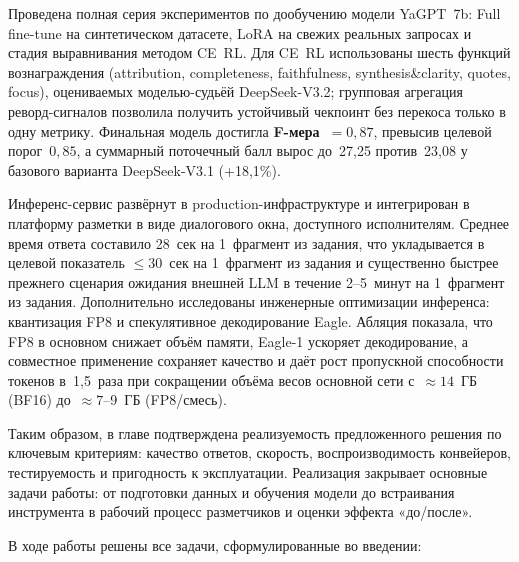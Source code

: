\documentclass[times]{itmo-student-thesis}
\begin{document}
Проведена полная серия экспериментов по дообучению модели YaGPT~7b:
Full fine-tune на синтетическом датасете, LoRA на свежих реальных запросах
и стадия выравнивания методом CE~RL. Для CE~RL использованы шесть функций вознаграждения
(attribution, completeness, faithfulness, synthesis\&clarity, quotes, focus),
оцениваемых моделью-судьёй DeepSeek-V3.2; групповая агрегация реворд-сигналов
позволила получить устойчивый чекпоинт без перекоса только в одну метрику.
Финальная модель достигла \textbf{F-мера~$= 0{,}87$}, превысив целевой
порог~$0{,}85$, а суммарный поточечный балл вырос до~27{,}25 против~23{,}08
у базового варианта DeepSeek-V3.1 (+18{,}1\%).

Инференс-сервис развёрнут в production-инфраструктуре и интегрирован
в платформу разметки в виде диалогового окна, доступного исполнителям.
Среднее время ответа составило 28~сек на 1~фрагмент из задания, что укладывается
в целевой показатель $\le 30$~сек на 1~фрагмент из задания и существенно быстрее
прежнего сценария ожидания внешней LLM в течение 2--5~минут на 1~фрагмент
из задания. Дополнительно исследованы инженерные оптимизации
инференса: квантизация FP8 и спекулятивное декодирование Eagle. Абляция
показала, что FP8 в основном снижает объём памяти, Eagle-1 ускоряет
декодирование, а совместное применение сохраняет качество и даёт рост
пропускной способности токенов в~1{,}5~раза при сокращении объёма весов
основной сети с~$\approx 14$~ГБ (BF16) до~$\approx 7$--9~ГБ (FP8/смесь).

Таким образом, в главе подтверждена реализуемость предложенного решения
по ключевым критериям: качество ответов, скорость, воспроизводимость
конвейеров, тестируемость и пригодность к эксплуатации. Реализация закрывает
основные задачи работы: от подготовки данных и обучения модели до встраивания
инструмента в рабочий процесс разметчиков и оценки эффекта «до/после».

\startconclusionpage

В ходе работы решены все задачи, сформулированные во введении:
\end{document}
